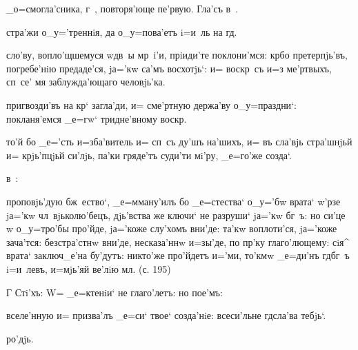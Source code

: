 
_о=смогла'сника, г~, повторя'юще пе'рвую. Гла'съ в~.%

стра'жи о_у='треннiя, да о_у=пова'етъ i=и~ль на гд.

сло'ву, вопло'щшемуся w\т дв~ы мр~i'и, прiиди'те 
поклони'мся: кр бо претерпjь'въ, погребе'нiю 
предаде'ся, jа='кw са'мъ восхотjь`: и= воскр~съ и=з\ъ 
ме'ртвыхъ, сп~се' мя заблужда'ющаго человjь'ка.

пригвозди'въ на кр` загла'ди, и= сме'ртную держа'ву 
о_у=праздни`: покланя'емся _е=гw` тридне'вному 
воскр.

то'й бо _е='сть и=зба'витель и= сп~съ ду'шъ на'шихъ, и= 
въ сла'вjь стра'шнjьй и= крjь'пцjьй си'лjь, па'ки 
гряде'тъ суди'ти мi'ру, _е=го'же созда`.

в~:%

проповjь'дую бж~ество`, _е=мману'илъ бо _е=стества` 
о_у='бw врата` w'рзе jа='кw чл~вjьколю'бецъ, 
дjь'вства же ключи` не разруши` jа='кw бг~ъ: но си'це w\т 
о_у=тро'бы про'йде, jа='коже слу'хомъ вни'де: та'кw 
воплоти'ся, jа='коже зача'тся: безстра'стнw вни'де, 
несказа'ннw и=зы'де, по пр'ку глаго'лющему: сiя^ 
врата` заключ_е'на бу'дутъ: никто'же про'йдетъ и='ми, 
то'кмw _е=ди'нъ гд бг~ъ i=и~левъ, и=мjь'яй ве'лiю 
мл. (с. 195)

Г%
Стi'хъ: W=%
_е=ктенiи` не глаго'летъ: но пое'мъ:%


вселе'нную и= призва'лъ _е=си` твое` созда'нiе: 
всеси'льне гд сла'ва тебjь`.



ро'дjь.

